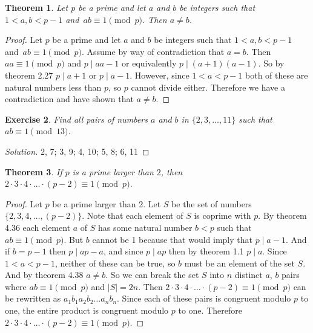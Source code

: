 \documentclass[12pt,leqno]{article}
\numberwithin{equation}{section}
\newtheorem{thm}{Theorem}[section]
\newtheorem{exer}[thm]{Exercise}
\theoremstyle{definition}
\newcommand{\card}[1]{\left| #1 \right|}
\begin{document}
\begin{thm}
Let $p$ be a prime and let $a$ and $b$ be integers such that $1 < a, b < p-1$ and~\mbox{$ab \equiv 1 \pmod{p}$}. Then $a \neq b$.
\end{thm}
\begin{proof}[Proof]
Let $p$ be a prime and let $a$ and $b$ be integers such that $1 < a, b < p-1$ and~\mbox{$ab \equiv 1 \pmod{p}$}. Assume by way of contradiction that $a = b$.  Then $aa \equiv 1 \pmod{p}$ and $p \mid aa - 1$ or equivalently $p \mid (a + 1)(a - 1)$.  So by theorem 2.27 $p \mid a + 1$ or $p \mid a - 1$.  However, since $1 < a < p-1$ both of these are natural numbers less than $p$, so $p$ cannot divide either.  Therefore we have a contradiction and have shown that $a \neq b$.
\end{proof}

\begin{exer}
 Find all pairs of numbers $a$ and $b$ in
$\{2, 3, \dots, 11\}$ such that $ab \equiv 1 \pmod{13}$.
\end{exer}
\begin{proof}[Solution]
2, 7; 3, 9; 4, 10; 5, 8; 6, 11
\end{proof}

\begin{thm}
If $p$ is a prime larger than $2$, then $2 \cdot 3 \cdot 4 \cdot
\hdots \cdot (p-2) \equiv 1 \pmod{p}$.
\end{thm}
\begin{proof}[Proof]
Let $p$ be a prime larger than 2.  Let $S$ be the set of numbers $\{2, 3, 4, \dots , (p-2)\}$.  Note that each element of $S$ is coprime with $p$.  By theorem 4.36 each element $a$ of $S$ has some natural number $b < p$ such that $ab \equiv 1 \pmod{p}$.  But $b$ cannot be 1 because that would imply that $p \mid a - 1$.  And if $b = p-1$ then $p \mid ap - a$, and since $p\mid ap$ then by theorem 1.1 $p \mid a$.  Since $1 < a < p-1$, neither of these can be true, so $b$ must be an element of the set $S$.  And by theorem 4.38 $a \neq b$.  So we can break the set $S$ into $n$ distinct $a$, $b$ pairs where $ab \equiv 1 \pmod{p}$ and $\card{S} = 2n$.  Then $2 \cdot 3 \cdot 4 \cdot \hdots \cdot (p-2) \equiv 1 \pmod{p}$ can be rewritten as $a_1b_1a_2b_2\dots a_nb_n$.  Since each of these pairs is congruent modulo $p$ to one, the entire product is congruent modulo $p$ to one.  Therefore $2 \cdot 3 \cdot 4 \cdot \hdots \cdot (p-2) \equiv 1 \pmod{p}$.
\end{proof}
\end{document}
